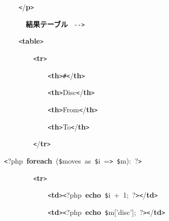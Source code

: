 \documentclass[a4paper,10pt]{article}
\def\mc{\relax}
\begin{document}
\noindent
\mbox{}{\tt\mc \ }{\tt\mc \ }{\tt\mc \ }{\tt\mc \ }{\tt <}/\textbf{p}{\tt >}

\noindent
\mbox{}\hfill

\noindent
\mbox{}{\tt\mc \ }{\tt\mc \ }{\tt\mc \ }{\tt\mc \ }\rm\mc {\tt <}{\tt !}{\tt -}{\tt -}\  \ {\bf 結果テーブル} \hfill \rm\mc \ {\tt -}{\tt -}{\tt >}
\tt\mc 

\noindent
\mbox{}{\tt\mc \ }{\tt\mc \ }{\tt\mc \ }{\tt\mc \ }{\tt <}\textbf{table}{\tt >}

\noindent
\mbox{}{\tt\mc \ }{\tt\mc \ }{\tt\mc \ }{\tt\mc \ }{\tt\mc \ }{\tt\mc \ }{\tt\mc \ }{\tt\mc \ }{\tt <}\textbf{tr}{\tt >}

\noindent
\mbox{}{\tt\mc \ }{\tt\mc \ }{\tt\mc \ }{\tt\mc \ }{\tt\mc \ }{\tt\mc \ }{\tt\mc \ }{\tt\mc \ }{\tt\mc \ }{\tt\mc \ }{\tt\mc \ }{\tt\mc \ }{\tt <}\textbf{th}{\tt >}{\tt\#}{\tt <}/\textbf{th}{\tt >}

\noindent
\mbox{}{\tt\mc \ }{\tt\mc \ }{\tt\mc \ }{\tt\mc \ }{\tt\mc \ }{\tt\mc \ }{\tt\mc \ }{\tt\mc \ }{\tt\mc \ }{\tt\mc \ }{\tt\mc \ }{\tt\mc \ }{\tt <}\textbf{th}{\tt >}Disc{\tt <}/\textbf{th}{\tt >}

\noindent
\mbox{}{\tt\mc \ }{\tt\mc \ }{\tt\mc \ }{\tt\mc \ }{\tt\mc \ }{\tt\mc \ }{\tt\mc \ }{\tt\mc \ }{\tt\mc \ }{\tt\mc \ }{\tt\mc \ }{\tt\mc \ }{\tt <}\textbf{th}{\tt >}From{\tt <}/\textbf{th}{\tt >}

\noindent
\mbox{}{\tt\mc \ }{\tt\mc \ }{\tt\mc \ }{\tt\mc \ }{\tt\mc \ }{\tt\mc \ }{\tt\mc \ }{\tt\mc \ }{\tt\mc \ }{\tt\mc \ }{\tt\mc \ }{\tt\mc \ }{\tt <}\textbf{th}{\tt >}To{\tt <}/\textbf{th}{\tt >}

\noindent
\mbox{}{\tt\mc \ }{\tt\mc \ }{\tt\mc \ }{\tt\mc \ }{\tt\mc \ }{\tt\mc \ }{\tt\mc \ }{\tt\mc \ }{\tt <}/\textbf{tr}{\tt >}

\noindent
\mbox{}{\tt <}?php{\tt\mc \ }\textbf{foreach}{\tt\mc \ }({\tt\$}moves{\tt\mc \ }as{\tt\mc \ }{\tt\$}i{\tt\mc \ }={\tt >}{\tt\mc \ }{\tt\$}m):{\tt\mc \ }?{\tt >}

\noindent
\mbox{}{\tt\mc \ }{\tt\mc \ }{\tt\mc \ }{\tt\mc \ }{\tt\mc \ }{\tt\mc \ }{\tt\mc \ }{\tt\mc \ }{\tt <}\textbf{tr}{\tt >}

\noindent
\mbox{}{\tt\mc \ }{\tt\mc \ }{\tt\mc \ }{\tt\mc \ }{\tt\mc \ }{\tt\mc \ }{\tt\mc \ }{\tt\mc \ }{\tt\mc \ }{\tt\mc \ }{\tt\mc \ }{\tt\mc \ }{\tt <}\textbf{td}{\tt >}{\tt <}?php{\tt\mc \ }\textbf{echo}{\tt\mc \ }{\tt\$}i{\tt\mc \ }+{\tt\mc \ }1;{\tt\mc \ }?{\tt >}{\tt <}/\textbf{td}{\tt >}

\noindent
\mbox{}{\tt\mc \ }{\tt\mc \ }{\tt\mc \ }{\tt\mc \ }{\tt\mc \ }{\tt\mc \ }{\tt\mc \ }{\tt\mc \ }{\tt\mc \ }{\tt\mc \ }{\tt\mc \ }{\tt\mc \ }{\tt <}\textbf{td}{\tt >}{\tt <}?php{\tt\mc \ }\textbf{echo}{\tt\mc \ }{\tt\$}m['disc'];{\tt\mc \ }?{\tt >}{\tt <}/\textbf{td}{\tt >}
\end{document}
